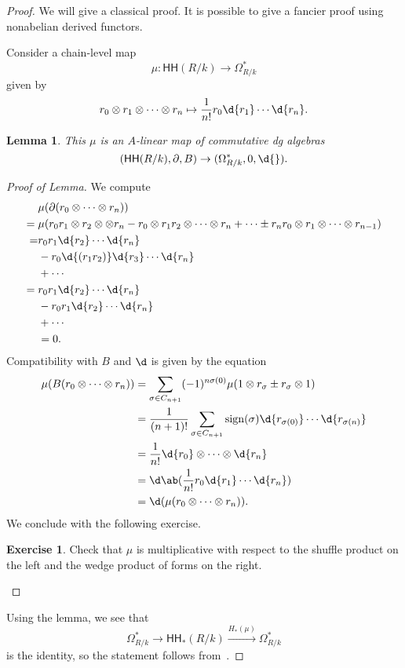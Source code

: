 \documentclass[10pt, oneside]{memoir}
\newtheorem{lem}[thm]{Lemma}
\theoremstyle{definition}
\newtheorem{exer}[thm]{Exercise}
\theoremstyle{remark}
\theoremstyle{plain}
\theoremstyle{definition}
\theoremstyle{remark}
\newcommand{\on}[1]{\operatorname{#1}}
\newcommand{\ms}[1]{\mathsf{#1}}
\newcommand{\1}{\mathbf{1}}
\newcommand{\2}{\mathbf{2}}
\newcommand{\3}{\mathbf{3}}
\newcommand{\HH}{\ms{HH}}
\begin{document}
\begin{proof}
    We will give a classical proof. It is possible to give a fancier proof using nonabelian derived functors.

    Consider a chain-level map
    \[ \mu \colon \HH(R/k) \to \Omega^*_{R/k} \]
    given by 
    \[ r_0 \otimes r_1 \otimes \cdots \otimes r_n \mapsto \frac{1}{n!} r_0 \d{r_1} \cdots \d{r_n}. \]
    \begin{lem}
        This $\mu$ is an $A$-linear map of commutative dg algebras
        \[ (\HH(R/k), \partial, B) \to (\Omega^*_{R/k}, 0, \d{}). \]
    \end{lem}
    \begin{proof}[Proof of Lemma]
        We compute
        \begin{align*}
            &\mu(\partial(r_0 \otimes \cdots \otimes r_n)) \\
            ={}& \mu (r_0 r_1 \otimes r_2 \otimes \otimes r_n - r_0 \otimes r_1 r_2 \otimes \cdots \otimes r_n + \cdots \pm r_n r_0 \otimes r_1 \otimes \cdots \otimes r_{n-1}) \\
            =&{} r_0 r_1 \d{r_2} \cdots \d{r_n} \\
            &- r_0 \d{(r_1 r_2)} \d{r_3} \cdots \d{r_n} \\
            &+ \cdots \\
            ={}& r_0 r_1 \d{r_2} \cdots \d{r_n} \\
            &- r_0 r_1 \d{r_2} \cdots \d{r_n} \\
            &+ \cdots \\
            &= 0.
        \end{align*}
        Compatibility with $B$ and $\d$ is given by the equation
        \begin{align*}
            \mu(B(r_0\otimes \cdots \otimes r_n)) &= \sum_{\sigma \in C_{n+1}} (-1)^{n\sigma(0)} \mu(1 \otimes r_{\sigma} \pm r_{\sigma} \otimes 1) \\
            &= \frac{1}{(n+1)!} \sum_{\sigma \in C_{n+1}} \on{sign}(\sigma) \d{r_{\sigma(0)}} \cdots \d{r_{\sigma(n)}} \\
            &= \frac{1}{n!} \d{r_0} \otimes \cdots \otimes \d{r_n} \\
            &= \d \ab(\frac{1}{n!} r_0 \d{r_1} \cdots \d{r_n}) \\
            &= \d(\mu(r_0 \otimes \cdots \otimes r_n)).
        \end{align*}
        We conclude with the following exercise.
        \begin{exer}
            Check that $\mu$ is multiplicative with respect to the shuffle product on the left and the wedge product of forms on the right. \qedhere
        \end{exer}
    \end{proof}
    Using the lemma, we see that
    \[ \Omega^*_{R/k} \to \HH_*(R/k) \xrightarrow{H_*(\mu)} \Omega^*_{R/k} \]
    is the identity, so the statement follows from~.
\end{proof}
\end{document}
